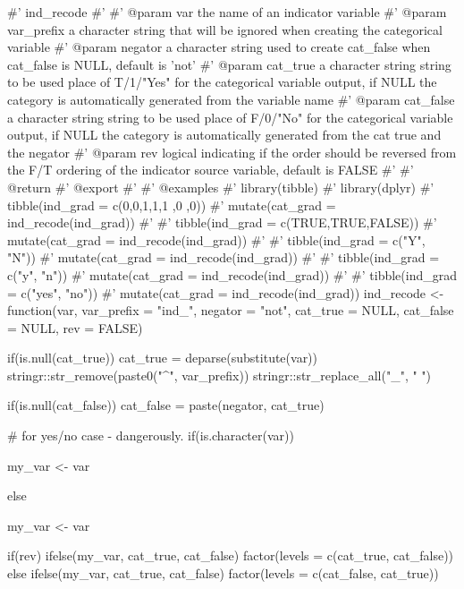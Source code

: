 \begin{Schunk}
\begin{Sinput}
#' ind_recode
#'
#' @param var the name of an indicator variable
#' @param var_prefix a character string that will be ignored when creating the categorical variable
#' @param negator a character string used to create cat_false when cat_false is NULL, default is 'not'
#' @param cat_true a character string string to be used place of  T/1/"Yes" for the categorical variable output, if NULL the category is automatically generated from the variable name
#' @param cat_false a character string string to be used place of  F/0/"No" for the categorical variable output, if NULL the category is automatically generated from the cat true and the negator
#' @param rev logical indicating if the order should be reversed from the F/T ordering of the indicator source variable, default is FALSE
#'
#' @return
#' @export
#'
#' @examples
#' library(tibble)
#' library(dplyr)
#' tibble(ind_grad = c(0,0,1,1,1 ,0 ,0)) %
#'   mutate(cat_grad  = ind_recode(ind_grad))
#'
#' tibble(ind_grad = c(TRUE,TRUE,FALSE)) %
#'   mutate(cat_grad  = ind_recode(ind_grad))
#'
#' tibble(ind_grad = c("Y", "N")) %
#'   mutate(cat_grad  = ind_recode(ind_grad))
#'
#' tibble(ind_grad = c("y", "n")) %
#'   mutate(cat_grad  = ind_recode(ind_grad))
#'
#' tibble(ind_grad = c("yes", "no")) %
#'   mutate(cat_grad  = ind_recode(ind_grad))
ind_recode <- function(var, var_prefix = "ind_", negator = "not",
                       cat_true = NULL, cat_false = NULL, rev = FALSE){

  if(is.null(cat_true)){
    cat_true = deparse(substitute(var)) %
      stringr::str_remove(paste0("^", var_prefix)) %
      stringr::str_replace_all("_", " ")
  }

  if(is.null(cat_false)){
    cat_false = paste(negator, cat_true)
  }

  # for yes/no case - dangerously.
  if(is.character({{var}})){

    my_var <- {{var}} %

  }else{

    my_var <- {{var}}
  }

  if(rev){
    ifelse(my_var, cat_true, cat_false) %
      factor(levels = c(cat_true, cat_false))
  }else{
    ifelse(my_var, cat_true, cat_false) %
      factor(levels = c(cat_false, cat_true))
  }


}
\end{Sinput}
\end{Schunk}

